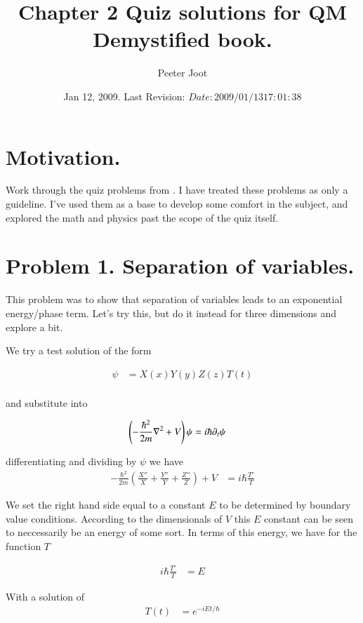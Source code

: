 \documentclass{article}
\title{ Chapter 2 Quiz solutions for QM Demystified book. }
\author{Peeter Joot}
\date{ Jan 12, 2009.  Last Revision: $Date: 2009/01/13 17:01:38 $ }
\begin{document}
\maketitle{}
\tableofcontents
\section{ Motivation. }

Work through the quiz problems from \cite{mcmahon2005qmd}.  I have treated these problems as only a guideline.  I've used them
as a base to develop some comfort in the subject, and explored the math and physics past the scope of the quiz itself.

\section{ Problem 1. Separation of variables. }

This problem was to show that separation of variables leads to an exponential energy/phase
term.  Let's try this, but do it instead for three dimensions and explore a bit.

We try a test solution of the form

\begin{align*}
\psi &= X(x) Y(y) Z(z) T(t) \\
\end{align*}

and substitute into 

\begin{align*}
\left(-\frac{\hbar^2}{2m}\nabla^2 + V\right) \psi &= i \hbar \partial_t \psi
\end{align*}

differentiating and dividing by $\psi$ we have
\begin{align*}
-\frac{\hbar^2}{2m}
\left(
\frac{X''}{X}
+\frac{Y''}{Y}
+\frac{Z''}{Z}
\right)
 + V &= i \hbar \frac{T'}{T}
\end{align*}

We set the right hand side equal to a constant $E$ to be determined by boundary value conditions.
According to the dimensionals of $V$ this $E$ constant can be seen to neccessarily be an energy
of some sort.  In terms of this energy, we have for the function $T$

\begin{align*}
i \hbar \frac{T'}{T} &= E
\end{align*}

With a solution of
\begin{align*}
T(t) &= e^{-i E t/\hbar}
\end{align*}
\end{document}
